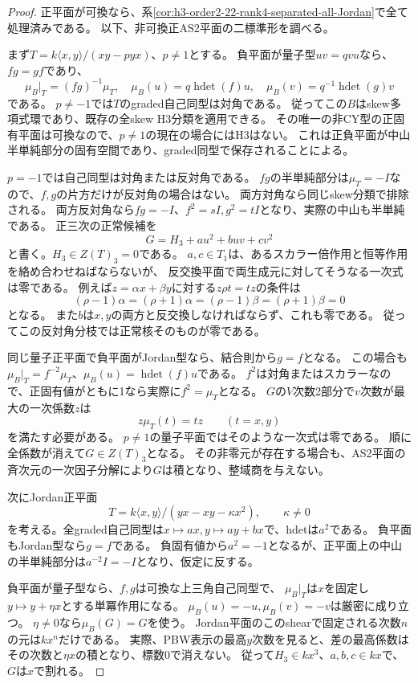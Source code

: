 \begin{proof}
正平面が可換なら、系\ref{cor:h3-order2-22-rank4-separated-all-Jordan}で全て処理済みである。
以下、非可換正AS2平面の二標準形を調べる。

まず$T=k\langle x,y\rangle/(xy-pyx)$、$p\ne1$とする。
負平面が量子型$uv=qvu$なら、$fg=gf$であり、
\[
 \mu_B|_T=(fg)^{-1}\mu_T,\quad
 \mu_B(u)=q\operatorname{hdet}(f)u,\quad
 \mu_B(v)=q^{-1}\operatorname{hdet}(g)v
\]
である。
$p\ne-1$では$T$のgraded自己同型は対角である。
従ってこの$B$はskew多項式環であり、既存の全skew H3分類を適用できる。
その唯一の非CY型の正固有平面は可換なので、$p\ne1$の現在の場合にはH3はない。
これは正負平面が中山半単純部分の固有空間であり、graded同型で保存されることによる。

$p=-1$では自己同型は対角または反対角である。
$fg$の半単純部分は$\mu_T=-I$なので、$f,g$の片方だけが反対角の場合はない。
両方対角なら同じskew分類で排除される。
両方反対角なら$fg=-I$、$f^2=sI,g^2=tI$となり、実際の中山も半単純である。
正三次の正常候補を
\[
 G=H_3+a u^2+buv+c v^2
\]
と書く。$H_3\in Z(T)_3=0$である。
$a,c\in T_1$は、あるスカラー倍作用と恒等作用を絡め合わせねばならないが、
反交換平面で両生成元に対してそうなる一次式は零である。
例えば$z=\alpha x+\beta y$に対する$z\rho t=tz$の条件は
\[
 (\rho-1)\alpha=(\rho+1)\alpha
 =(\rho-1)\beta=(\rho+1)\beta=0
\]
となる。
また$b$は$x,y$の両方と反交換しなければならず、これも零である。
従ってこの反対角分枝では正常核そのものが零である。

同じ量子正平面で負平面がJordan型なら、結合則から$g=f$となる。
この場合も$\mu_B|_T=f^{-2}\mu_T$、$\mu_B(u)=\operatorname{hdet}(f)u$である。
$f^2$は対角またはスカラーなので、正固有値がともに1なら実際に$f^2=\mu_T$となる。
$G$の$V$次数2部分で$v$次数が最大の一次係数$z$は
\[
 z\mu_T(t)=tz\qquad(t=x,y)
\]
を満たす必要がある。
$p\ne1$の量子平面ではそのような一次式は零である。
順に全係数が消えて$G\in Z(T)_3$となる。
その非零元が存在する場合も、AS2平面の斉次元の一次因子分解により$G$は積となり、整域商を与えない。

次にJordan正平面
\[
 T=k\langle x,y\rangle/(yx-xy-\kappa x^2),\qquad\kappa\ne0
\]
を考える。全graded自己同型は$x\mapsto a x,y\mapsto a y+b x$で、hdetは$a^2$である。
負平面もJordan型なら$g=f$である。
負固有値から$a^2=-1$となるが、正平面上の中山の半単純部分は$a^{-2}I=-I$となり、仮定に反する。

負平面が量子型なら、$f,g$は可換な上三角自己同型で、
$\mu_B|_T$は$x$を固定し$y\mapsto y+\eta x$とする単冪作用になる。
$\mu_B(u)=-u,\mu_B(v)=-v$は厳密に成り立つ。
$\eta\ne0$なら$\mu_B(G)=G$を使う。
Jordan平面のこのshearで固定される次数$n$の元は$kx^n$だけである。
実際、PBW表示の最高$y$次数を見ると、差の最高係数はその次数と$\eta x$の積となり、標数0で消えない。
従って$H_3\in kx^3$、$a,b,c\in kx$で、$G$は$x$で割れる。


\end{proof}
